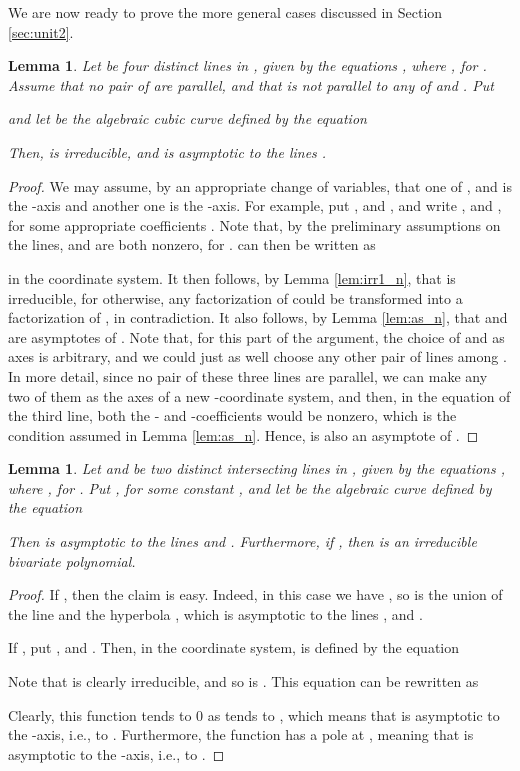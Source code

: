 \documentclass[12pt]{article}
\newtheorem{lemma}[theorem]{Lemma}
\begin{document}
We are now ready to prove the more general cases discussed in
Section \ref{sec:unit2}.
\begin{lemma} \label{lem:as1}
Let  be four distinct lines in
, given by the equations , where
, for .
Assume that no pair of  are parallel,
and that  is not parallel to any of  and .
Put

and
let  be the algebraic cubic curve defined by the equation

Then,  is irreducible, and  is asymptotic to the lines
.
\end{lemma}
\begin{proof}
We may assume, by an appropriate change of variables, that one of
, and  is the -axis and another one is
the -axis. For example, put , and , and write
, and
,
for some appropriate coefficients
.
Note that, by the preliminary assumptions on the lines,
 and  are both nonzero, for .
 can then be written as

in the  coordinate system. It then follows, by Lemma
\ref{lem:irr1_n}, that  is irreducible, for otherwise, any
factorization of  could be transformed into a factorization of
, in contradiction.
It also follows, by Lemma \ref{lem:as_n}, that  and
 are asymptotes of .
Note that, for this part of the argument, the choice of 
 and  as axes is arbitrary, and we could just 
as well choose any other pair of lines among .
In more detail, since no pair of these three lines are parallel, we
can make any two of them as the axes of a new -coordinate 
system, and then, in the equation of the third line, both the - and
-coefficients would be nonzero, which is the condition assumed in 
Lemma \ref{lem:as_n}. Hence,  is also an asymptote of .
\end{proof}

\begin{lemma} \label{lem:as2}
Let  and  be two distinct intersecting lines in
, given by the equations , where
, for .
Put , for some constant , and
let  be the algebraic curve defined by the equation

Then  is asymptotic to the lines  and .
Furthermore, if , then  is an irreducible bivariate
polynomial.
\end{lemma}
\begin{proof}
If , then the claim is easy. Indeed, in this case we
have , so  is the union of the line
 and the hyperbola , which is asymptotic to
the lines , and .

If , put , and . Then, in the 
coordinate system,  is defined by the equation

Note that  is clearly irreducible, and so is .
This equation can be rewritten as

Clearly, this function tends to 0 as  tends to , which
means that  is asymptotic to the -axis, i.e.,
to .
Furthermore, the function has a pole at , meaning that
 is asymptotic to the -axis, i.e., to .
\end{proof}
\end{document}
